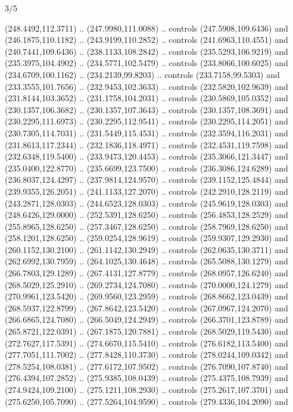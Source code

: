 \begin{flagdescription}{3/5}
\begin{scope}[xshift=0.5\flaglength,yshift=0.5\flagwidth,scale=\flagwidth/270]
\begin{scope}[y=0.8pt, x=0.8pt, yscale=-1,shift={(-281.25,-168.75)}]
  (248.4492,112.3711) .. (247.9980,111.0088) .. controls (247.5908,109.6436) and
  (246.1875,110.1182) .. (243.9199,110.2852) .. controls (241.6963,110.4551) and
  (240.7441,109.6436) .. (238.1133,108.2842) .. controls (235.5293,106.9219) and
  (235.3975,104.4902) .. (234.5771,102.5479) .. controls (233.8066,100.6025) and
  (234.6709,100.1162) .. (234.2139,99.8203) .. controls (233.7158,99.5303) and
  (233.3555,101.7656) .. (232.9453,102.3633) .. controls (232.5820,102.9639) and
  (231.8144,103.3652) .. (231.1758,104.2031) .. controls (230.5869,105.0352) and
  (230.1357,106.3682) .. (230.1357,107.3643) .. controls (230.1357,108.3691) and
  (230.2295,111.6973) .. (230.2295,112.9541) .. controls (230.2295,114.2051) and
  (230.7305,114.7031) .. (231.5449,115.4531) .. controls (232.3594,116.2031) and
  (231.8613,117.2344) .. (232.1836,118.4971) .. controls (232.4531,119.7598) and
  (232.6348,119.5400) .. (233.9473,120.4453) .. controls (235.3066,121.3447) and
  (235.0400,122.8770) .. (235.6699,123.7500) .. controls (236.3086,124.6289) and
  (236.8037,124.4297) .. (237.9814,124.9570) .. controls (239.1152,125.4844) and
  (239.9355,126.2051) .. (241.1133,127.2070) .. controls (242.2910,128.2119) and
  (243.2871,128.0303) .. (244.6523,128.0303) .. controls (245.9619,128.0303) and
  (248.6426,129.0000) .. (252.5391,128.6250) .. controls (256.4853,128.2529) and
  (255.8965,128.6250) .. (257.3467,128.6250) .. controls (258.7969,128.6250) and
  (258.1201,128.6250) .. (259.0254,128.9619) .. controls (259.9307,129.2930) and
  (260.1152,130.2100) .. (261.1142,130.2949) .. controls (262.0635,130.3711) and
  (262.6992,130.7959) .. (264.1025,130.4648) .. controls (265.5088,130.1279) and
  (266.7803,129.1289) .. (267.4131,127.8779) .. controls (268.0957,126.6240) and
  (268.5029,125.2910) .. (269.2734,124.7080) .. controls (270.0000,124.1279) and
  (270.9961,123.5420) .. (269.9560,123.2959) .. controls (268.8662,123.0439) and
  (268.5937,122.8799) .. (267.8642,123.5420) .. controls (267.0967,124.2070) and
  (266.6865,124.7080) .. (266.5049,124.2949) .. controls (266.3701,123.8789) and
  (265.8721,122.0391) .. (267.1875,120.7881) .. controls (268.5029,119.5430) and
  (272.7627,117.5391) .. (274.6670,115.5410) .. controls (276.6182,113.5400) and
  (277.7051,111.7002) .. (277.8428,110.3730) .. controls (278.0244,109.0342) and
  (278.5254,108.0381) .. (277.6172,107.9502) .. controls (276.7090,107.8740) and
  (276.4394,107.2852) .. (275.9385,108.0439) .. controls (275.4375,108.7939) and
  (274.9424,109.2100) .. (275.1211,108.2930) .. controls (275.2617,107.3701) and
  (275.6250,105.7090) .. (277.5264,104.9590) .. controls (279.4336,104.2090) and

\end{scope}
\end{scope}
\end{flagdescription}
